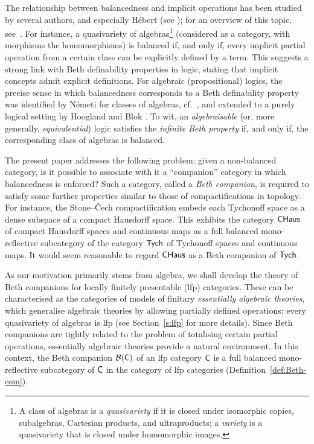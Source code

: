 \documentclass[a4paper,10pt,reqno]{amsart}
\theoremstyle{definition}
\theoremstyle{remark}
\newcommand{\cat}{{\sf C}}								%
\newcommand{\CHaus}{{\sf CHaus}}							%
\newcommand{\Tych}{{\sf Tych}}							%
\newcommand{\B}[1]{\mathcal{B}(#1)}						%
\begin{document}
The relationship between balancedness and implicit operations has been studied by several authors, and especially H\'ebert (see \cite{Hebert1993,Hebert1998}); for an overview of this topic, see~\cite{Reggio2026}. 
%
For instance, a quasivariety of algebras\footnote{A class of algebras is a \emph{quasivariety} if it is closed under isomorphic copies, subalgebras, Cartesian products, and ultraproducts; a \emph{variety} is a quasivariety that is closed under homomorphic images.} (considered as a category, with morphisms the homomorphisms) is balanced if, and only if, every implicit partial operation from a certain class can be explicitly defined by a term. 
%
This suggests a strong link with Beth definability properties in logic, stating that implicit concepts admit explicit definitions. For algebraic (propositional) logics, the precise sense in which balancedness corresponds to a Beth definability property was identified by N\'emeti for classes of algebras, cf.~\cite[Theorem~5.6.10]{HMT1985}, and extended to a purely logical setting by Hoogland and Blok \cite{Hoogland2000,BH2006}. To wit, an \emph{algebraisable} (or, more generally, \emph{equivalential}) logic satisfies the \emph{infinite Beth property} if, and only if, the corresponding class of algebras is balanced.  

The present paper addresses the following problem: given a non-balanced category, is it possible to associate with it a ``companion'' category in which balancedness is enforced? Such a category, called a \emph{Beth companion}, is required to satisfy some further properties similar to those of compactifications in topology. For instance, the Stone--\v{C}ech compactification embeds each Tychonoff space as a dense subspace of a compact Hausdorff space. This exhibits the category $\CHaus$ of compact Hausdorff spaces and continuous maps as a full balanced mono-reflective subcategory of the category $\Tych$ of Tychonoff spaces and continuous maps. It would seem reasonable to regard $\CHaus$ as a Beth companion of $\Tych$.

As our motivation primarily stems from algebra, we shall develop the theory of Beth companions for locally finitely presentable (lfp) categories. These can be characterised as the categories of models of finitary \emph{essentially algebraic theories}, which generalise algebraic theories by allowing partially defined operations; every quasivariety of algebras is lfp (see Section~\ref{s:lfp} for more details). Since Beth companions are tightly related to the problem of totalising certain partial operations, essentially algebraic theories provide a natural environment. In this context, the Beth companion $\B{\cat}$ of an lfp category $\cat$ is a full balanced mono-reflective subcategory of $\cat$ in the category of lfp categories (Definition~\ref{def:Beth-com}).
\end{document}
